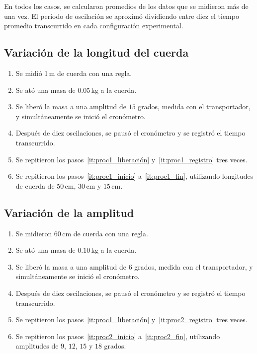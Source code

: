 \documentclass[twocolumn]{article}
\numberwithin{table}{section}
\begin{document}
En todos los casos, se calcularon promedios de los datos que se
midieron más de una vez. El periodo de oscilación se aproximó
dividiendo entre diez el tiempo promedio transcurrido en cada configuración
experimental.

\subsection{Variación de la longitud del cuerda}

\begin{enumerate}
  \item Se midió 1\,m de cuerda con una regla.\label{it:proc1_inicio}
  \item Se ató una masa de $0.05$\,kg a la cuerda.
  \item Se liberó la masa a una amplitud de $15$ grados, medida con
    el transportador, y simultáneamente se inició el
    cronómetro.\label{it:proc1_liberación}
  \item Después de diez oscilaciones, se pausó el cronómetro y se
    registró el tiempo transcurrido.\label{it:proc1_registro}
  \item Se repitieron los pasos~\ref{it:proc1_liberación}
    y~\ref{it:proc1_registro} tres veces.\label{it:proc1_fin}
  \item Se repitieron los pasos~\ref{it:proc1_inicio}
    a~\ref{it:proc1_fin}, utilizando longitudes de cuerda de
    $50$\,cm, $30$\,cm y $15$\,cm.
\end{enumerate}

\subsection{Variación de la amplitud}

\begin{enumerate}
  \item Se midieron 60\,cm de cuerda con una regla.\label{it:proc2_inicio}
  \item Se ató una masa de $0.10$\,kg a la cuerda.
  \item Se liberó la masa a una amplitud de $6$ grados, medida con
    el transportador, y simultáneamente se inició el
    cronómetro.
  \item Después de diez oscilaciones, se pausó el cronómetro y se
    registró el tiempo transcurrido.\label{it:proc2_registro}
  \item Se repitieron los pasos~\ref{it:proc1_liberación}
    y~\ref{it:proc2_registro} tres veces.\label{it:proc2_fin}
  \item Se repitieron los pasos~\ref{it:proc2_inicio}
    a~\ref{it:proc2_fin}, utilizando amplitudes de
    $9$, $12$, $15$ y $18$ grados.
\end{enumerate}
\end{document}
